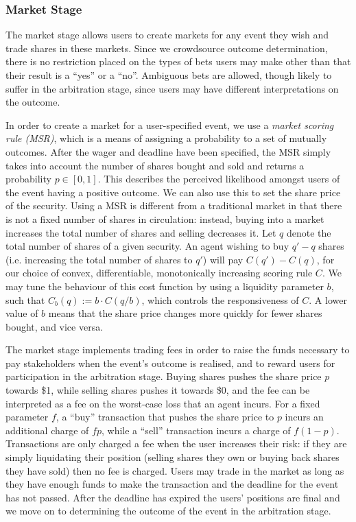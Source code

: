 \documentclass[10pt,a4paper]{article}
\theoremstyle{plain}
\theoremstyle{definition}
\begin{document}
\subsubsection{Market Stage}

The market stage allows users to create markets for any event they wish and
trade shares in these markets. Since we crowdsource outcome determination,
there is no restriction placed on the types of bets users may make other than
that their result is a ``yes'' or a ``no''. Ambiguous bets are allowed, though
likely to suffer in the arbitration stage, since users may have different
interpretations on the outcome.

In order to create a market for a user-specified event, we use a \emph{market
scoring rule (MSR)}, which is a means of assigning a probability to a set of
mutually outcomes. After the wager and deadline have been specified, the MSR
simply takes into account the number of shares bought and sold and returns a
probability $p \in [0,1]$. This describes the perceived likelihood amongst
users of the event having a positive outcome. We can also use this to set the
share price of the security.  Using a MSR is different from a traditional
market in that there is not a fixed number of shares in circulation: instead,
buying into a market increases the total number of shares and selling decreases
it. Let $q$ denote the total number of shares of a given security. An agent
wishing to buy $q'-q$ shares (i.e. increasing the total number of shares to
$q'$) will pay $C(q')-C(q)$, for our choice of convex, differentiable,
monotonically increasing scoring rule $C$. We may tune the behaviour of this
cost function by using a liquidity parameter $b$, such that $C_b(q) := b \cdot
C(q/b)$, which controls the responsiveness of $C$. A lower value of $b$ means
that the share price changes more quickly for fewer shares bought, and vice
versa.

The market stage implements trading fees in order to raise the funds necessary
to pay stakeholders when the event's outcome is realised, and to reward users
for participation in the arbitration stage. Buying shares pushes the share
price $p$ towards \$1, while selling shares pushes it towards \$0, and the fee
can be interpreted as a fee on the worst-case loss that an agent incurs. For a
fixed parameter $f$, a ``buy'' transaction that pushes the share price to $p$
incurs an additional charge of $fp$, while a ``sell'' transaction incurs a
charge of $f(1-p)$. Transactions are only charged a fee when the user increases
their risk: if they are simply liquidating their position (selling shares they
own or buying back shares they have sold) then no fee is charged.  Users may
trade in the market as long as they have enough funds to make the transaction
and the deadline for the event has not passed. After the deadline has expired
the users' positions are final and we move on to determining the outcome of the
event in the arbitration stage.
\end{document}
